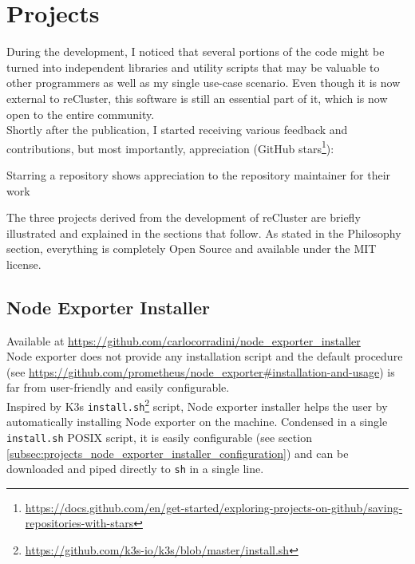 \chapter{Projects}
\label{cha:projects}

During the development, I noticed that several portions of the code might be
turned into independent libraries and utility scripts that may be valuable to
other programmers as well as my single use-case scenario. Even though it is now external
to reCluster, this software is still an essential part of it, which is now open to
the entire community. \\ Shortly after the publication, I started receiving various
feedback and contributions, but most importantly, appreciation (GitHub stars\footnote{\url{https://docs.github.com/en/get-started/exploring-projects-on-github/saving-repositories-with-stars}}):
\begin{displayquote}
  Starring a repository shows appreciation to the repository maintainer for their
  work\cite{github_stars}
\end{displayquote}
The three projects derived from the development of reCluster are briefly
illustrated and explained in the sections that follow. As stated in the Philosophy
section, everything is completely Open Source and available under the MIT
license.

\section{Node Exporter Installer}
\label{sec:projects_node_exporter_installer}

Available at \url{https://github.com/carlocorradini/node\_exporter\_installer} \\
Node exporter does not provide any installation script and the default procedure
(see \url{https://github.com/prometheus/node_exporter#installation-and-usage}) is
far from user-friendly and easily configurable. \\ Inspired by K3s \texttt{install.sh}\footnote{\url{https://github.com/k3s-io/k3s/blob/master/install.sh}}
script, Node exporter installer helps the user by automatically installing Node
exporter on the machine. Condensed in a single \texttt{install.sh} POSIX script,
it is easily configurable (see section
\ref{subsec:projects_node_exporter_installer_configuration}) and can be downloaded
and piped directly to \texttt{sh} in a single line.

